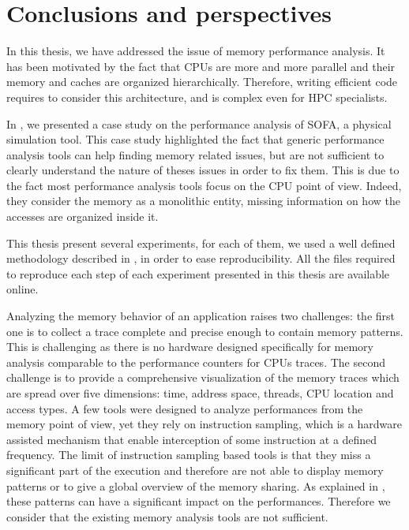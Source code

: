 \chapter{Conclusions and perspectives}
\label{chap:cncl}

In this thesis, we have addressed the issue of memory performance analysis.
It has been motivated by the fact that \glspl{CPU} are more and more parallel and their memory and caches are organized hierarchically.
Therefore, writing efficient code requires to consider this architecture, and is complex even for \gls{HPC} specialists.

In , we presented a case study on the performance analysis of \gls{SOFA}, a physical simulation tool.
This case study highlighted the fact that generic performance analysis tools can help finding memory related issues, but are not sufficient to clearly understand the nature of theses issues in order to fix them.
This is due to the fact most performance analysis tools focus on the \gls{CPU} point of view.
Indeed, they consider the memory as a monolithic entity, missing information on how the accesses are organized inside it.

This thesis present several experiments, for each of them, we used a well defined methodology described in , in order to ease reproducibility.
All the files required to reproduce each step of each experiment presented in this thesis are available online.

Analyzing the memory behavior of an application raises two challenges: the first one is to collect a trace complete and precise enough to contain memory patterns.
This is challenging as there is no hardware designed specifically for memory analysis comparable to the performance counters for \glspl{CPU} traces.
The second challenge is to provide a comprehensive visualization of the memory traces which are spread over five dimensions: time, address space, threads, \gls{CPU} location and access types.
A few tools were designed to analyze performances from the memory point of view, yet they rely on instruction sampling, which is a hardware assisted mechanism that enable interception of some instruction at a defined frequency.
The limit of instruction sampling based tools is that they miss a significant part of the execution and therefore are not able to display memory patterns or to give a global overview of the memory sharing.
As explained in , these patterns can have a significant impact on the performances.
Therefore we consider that the existing memory analysis tools are not sufficient.

